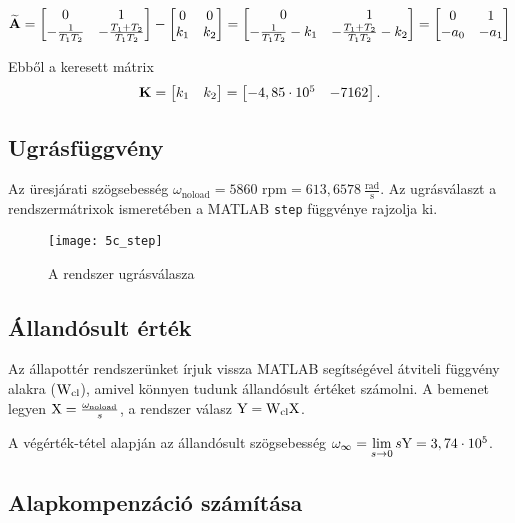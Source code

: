\begin{equation}
	\widetilde{\boldsymbol{\mathrm{A}}} = \begin{bmatrix}0&1\\-\frac{1}{T_1T_2}&-\frac{T_1+T_2}{T_1T_2}\end{bmatrix} - 
	\begin{bmatrix}0&0\\k_1&k_2\end{bmatrix} = \begin{bmatrix}0&1\\-\frac{1}{T_1T_2}-k_1&-\frac{T_1+T_2}{T_1T_2}-k_2\end{bmatrix} = 
	\begin{bmatrix}0&1\\ -a_0& -a_1\end{bmatrix}
\end{equation}

Ebből a keresett mátrix
\begin{equation}
	\boldsymbol{\mathrm{K}} = \begin{bmatrix}k_1&k_2\end{bmatrix} = \begin{bmatrix}-4,85\cdot10^5& -7162\end{bmatrix}.
\end{equation}


\subsection{Ugrásfüggvény}

Az üresjárati szögsebesség $\omega_\text{noload} = 5860\text{ rpm} = 613,6578~\frac{\text{rad}}{\text{s}}$. Az ugrásválaszt a rendszermátrixok ismeretében a MATLAB \verb|step| függvénye rajzolja ki.

\begin{figure}[H]
	\centering
	\texttt{[image: 5c\_step]}
	\caption{A rendszer ugrásválasza}
	\label{fig:5c_step}
\end{figure}



\subsection{Állandósult érték}\label{subsec:5d}

Az állapottér rendszerünket írjuk vissza MATLAB segítségével átviteli függvény
alakra ($\mathrm{W}_\text{cl}$), amivel könnyen tudunk állandósult értéket számolni.
A bemenet legyen $\mathrm{X} = \frac{\omega_\text{noload}}{s}$, a rendszer válasz $\mathrm{Y} = \mathrm{W}_\text{cl}\mathrm{X}$.

A végérték-tétel alapján az állandósult szögsebesség $\omega_\infty = \lim\limits_{s\rightarrow 0}s\mathrm{Y} = 3,74\cdot 10^5$.


\subsection{Alapkompenzáció számítása}

